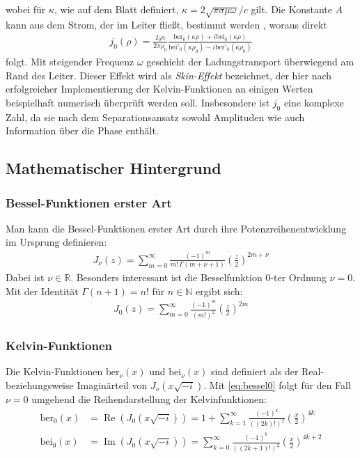 \documentclass[10pt,a4paper]{article}
\begin{document}
wobei für $\kappa$, wie auf dem Blatt definiert, $\kappa = 2 \sqrt{\pi \sigma \mu \omega}/c$ gilt.
Die Konstante $A$ kann aus dem Strom, der im Leiter fließt, bestimmt werden \cite{kazimierczuk}, woraus direkt
\begin{align}
	j_0(\rho) = \frac{I_0 \kappa}{2\pi\rho_0}\frac{\mathrm{ber}_0(\kappa\rho)+i \mathrm{bei}_0(\kappa\rho)}{\mathrm{bei}'_0(\kappa\rho_0)-i\mathrm{ber}'_0(\kappa\rho_0)}
\end{align}
folgt. Mit steigender Frequenz $\omega$ geschieht der Ladungstransport überwiegend am Rand des Leiter. Dieser Effekt wird als \emph{Skin-Effekt} bezeichnet, der hier nach erfolgreicher Implementierung der Kelvin-Funktionen an einigen Werten beispielhaft numerisch überprüft werden soll. Insbesondere ist $j_0$ eine komplexe Zahl, da sie nach dem Separationsansatz sowohl Amplituden wie auch Information über die Phase enthält.
\subsection{Mathematischer Hintergrund}

\subsubsection{Bessel-Funktionen erster Art}

Man kann die Bessel-Funktionen erster Art durch ihre Potenzreihenentwicklung im Ursprung definieren:
\begin{align}
	J_\nu(z) = \sum^{\infty}_{m=0} \frac{\left( -1 \right)^m}{m! \, \Gamma(m + \nu + 1)} \left(\frac{z}{2}\right)^{2m+\nu}
\end{align}
Dabei ist $\nu \in \mathbb{R}$. Besonders interessant ist die Besselfunktion 0-ter Ordnung $\nu = 0$.
Mit der Identität $\Gamma(n+1) = n!$ für $n \in \mathbb{N}$ ergibt sich:
\begin{align}
	\label{eq:bessel0}
	J_0(z) = \sum^{\infty}_{m=0} \frac{\left( -1 \right)^m}{\left( m! \right)^2} \left( \frac{z}{2} \right)^{2m}
\end{align}

\subsubsection{Kelvin-Funktionen}

Die Kelvin-Funktionen $\mathrm{ber}_\nu(x)$ und $\mathrm{bei}_\nu(x)$ sind definiert als der Real-
beziehungsweise Imaginärteil von $J_\nu(x \sqrt{-i} )$. Mit \ref{eq:bessel0}
folgt für den Fall $\nu = 0$ umgehend die Reihendarstellung der Kelvinfunktionen:
\begin{align}
	\mathrm{ber}_0(x) &= \operatorname{Re}\left(J_0(x \sqrt{-i} )\right) = 1 + \sum^{\infty}_{k=1} \frac{\left( -1 \right)^k}{\left( \left(2k\right)! \right)^2} \left( \frac{x}{2} \right)^{4k} \label{eq:berpotenzreihe}\\
	\mathrm{bei}_0(x) &= \operatorname{Im}\left(J_0(x \sqrt{-i} )\right) = \sum^{\infty}_{k=0} \frac{\left( -1 \right)^k}{\left( \left(2k+1\right)! \right)^2} \left( \frac{x}{2} \right)^{4k+2}\label{eq:beipotenzreihe}
\end{align}
\end{document}
